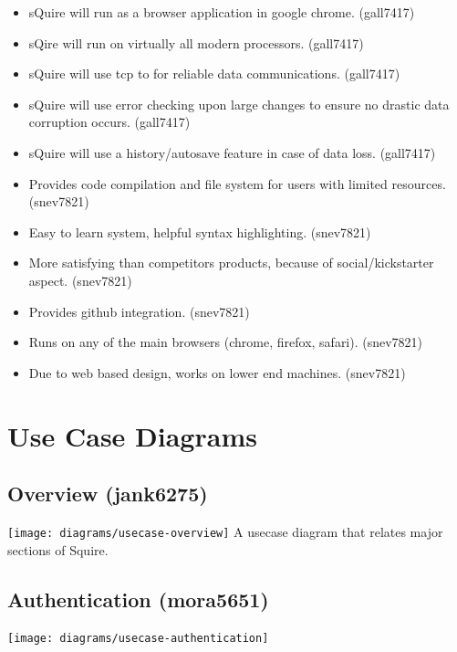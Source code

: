 \documentclass[11pt]{report}
\begin{document}
\begin{itemize}
        \item sQuire will run as a browser application in google chrome. (gall7417)
        \item sQire will run on virtually all modern processors. (gall7417)
        \item sQuire will use tcp to for reliable data communications. (gall7417)
        \item sQuire will use error checking upon large changes to ensure no drastic data corruption occurs. (gall7417)
        \item sQuire will use a history/autosave feature in case of data loss. (gall7417)
        \item Provides code compilation and file system for users with limited resources. (snev7821)
        \item Easy to learn system, helpful syntax highlighting. (snev7821)
        \item More satisfying than competitors products, because of social/kickstarter aspect. (snev7821)
        \item Provides github integration. (snev7821)
        \item Runs on any of the main browsers (chrome, firefox, safari). (snev7821)
        \item Due to web based design, works on lower end machines. (snev7821)
    \end{itemize}


\chapter{Use Case Diagrams}
    \section{Overview (jank6275)}
        \texttt{[image: diagrams/usecase-overview]}
        A usecase diagram that relates major sections of Squire.
    \section{Authentication (mora5651)}
        \texttt{[image: diagrams/usecase-authentication]}
\end{document}
